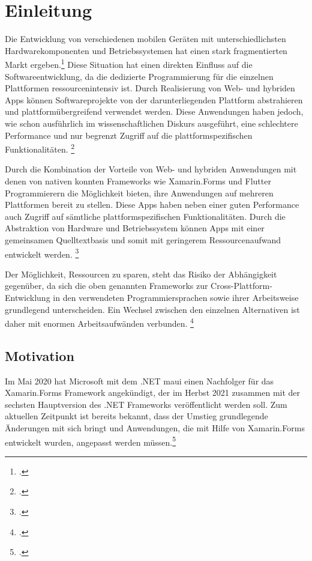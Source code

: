 \chapter{Einleitung}
Die Entwicklung von verschiedenen mobilen Geräten mit unterschiedlichsten Hardwarekomponenten und Betriebssystemen hat einen stark fragmentierten Markt ergeben.\footcite[Vgl.][S. 3]{Joorabchi2016}  Diese Situation hat einen direkten Einfluss auf die Softwareentwicklung, da die dedizierte Programmierung für die einzelnen Plattformen ressourcenintensiv ist.  Durch Realisierung von Web- und hybriden Apps können Softwareprojekte von der darunterliegenden Plattform abstrahieren und plattformübergreifend verwendet werden.  Diese Anwendungen haben jedoch, wie schon ausführlich im wissenschaftlichen Diskurs ausgeführt,  eine schlechtere Performance und nur begrenzt Zugriff auf die plattformspezifischen Funktionalitäten.  \footcite[Vgl.][S. 110ff.]{Barton2016} 

Durch die Kombination der Vorteile von Web- und hybriden Anwendungen mit denen von nativen konnten Frameworks wie Xamarin.Forms und Flutter Programmierern die Möglichkeit bieten,  ihre Anwendungen auf mehreren Plattformen bereit zu stellen.  Diese Apps haben neben einer guten Performance auch Zugriff auf sämtliche plattformspezifischen Funktionalitäten.  Durch die Abstraktion von Hardware und Betriebssystem können Apps mit einer gemeinsamen Quelltextbasis und somit mit geringerem Ressourcenaufwand entwickelt werden. \footcite[Vgl.][S. 295]{Vollmer2017} 

Der Möglichkeit, Ressourcen zu sparen, steht das Risiko der Abhängigkeit gegenüber, da sich die oben genannten Frameworks zur Cross-Plattform-Entwicklung in den verwendeten Programmiersprachen sowie ihrer Arbeitsweise grundlegend unterscheiden.  Ein Wechsel zwischen den einzelnen Alternativen ist daher mit enormen Arbeitsaufwänden verbunden. \footcite[Vgl.][S. 64]{Wissel2017}  

\section{Motivation}
Im Mai 2020 hat Microsoft mit dem .NET \ac{maui} einen Nachfolger für das Xamarin.Forms Framework angekündigt, der im Herbst 2021 zusammen mit der sechsten Hauptversion des .NET Frameworks veröffentlicht werden soll. Zum aktuellen Zeitpunkt ist bereits bekannt, dass der Umstieg grundlegende Änderungen mit sich bringt und Anwendungen,  die mit Hilfe von Xamarin.Forms entwickelt wurden,  angepasst werden müssen.\footcite[Vgl.][Abgerufen am 28.10.2020]{Hunter2020}

